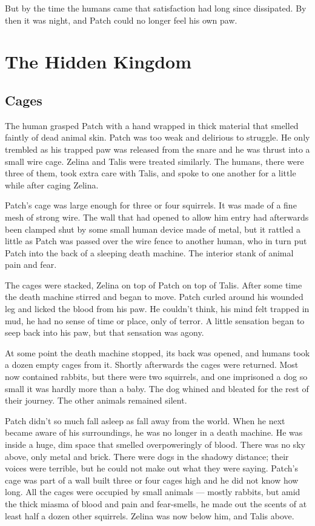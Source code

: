\documentclass[12pt]{book}
\begin{document}
But by the time the humans came that satisfaction had long since
dissipated. By then it was night, and Patch could no longer feel his
own paw.


\chapter{The Hidden Kingdom}

\section{Cages}

The human grasped Patch with a hand wrapped in thick material that
smelled faintly of dead animal skin. Patch was too weak and delirious
to struggle. He only trembled as his trapped paw was released from the
snare and he was thrust into a small wire cage. Zelina and Talis were
treated similarly. The humans, there were three of them, took extra
care with Talis, and spoke to one another for a little while after
caging Zelina.

Patch's cage was large enough for three or four squirrels. It was made
of a fine mesh of strong wire. The wall that had opened to allow him
entry had afterwards been clamped shut by some small human device made
of metal, but it rattled a little as Patch was passed over the wire
fence to another human, who in turn put Patch into the back of a
sleeping death machine. The interior stank of animal pain and fear.

The cages were stacked, Zelina on top of Patch on top of Talis. After
some time the death machine stirred and began to move. Patch curled
around his wounded leg and licked the blood from his paw. He couldn't
think, his mind felt trapped in mud, he had no sense of time or place,
only of terror. A little sensation began to seep back into his paw,
but that sensation was agony.

At some point the death machine stopped, its back was opened, and
humans took a dozen empty cages from it. Shortly afterwards the cages
were returned. Most now contained rabbits, but there were two
squirrels, and one imprisoned a dog so small it was hardly more than a
baby. The dog whined and bleated for the rest of their journey. The
other animals remained silent.

Patch didn't so much fall asleep as fall away from the world. When he
next became aware of his surroundings, he was no longer in a death
machine. He was inside a huge, dim space that smelled overpoweringly
of blood. There was no sky above, only metal and brick. There were
dogs in the shadowy distance; their voices were terrible, but he could
not make out what they were saying. Patch's cage was part of a wall
built three or four cages high and he did not know how long. All the
cages were occupied by small animals --- mostly rabbits, but amid the
thick miasma of blood and pain and fear-smells, he made out the scents
of at least half a dozen other squirrels. Zelina was now below him,
and Talis above.
\end{document}
